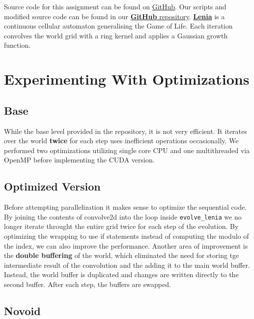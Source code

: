 \documentclass[11pt]{article}
\begin{document}
\maketitle

Source code for this assignment can be found on \href{https://github.com/laspp/HPC/blob/main/labs/03-Assignment2-CUDA/Assignment2.md}{GitHub}.
Our scripts and modified source code can be found in our \href{https://github.com/Edelwy/HPC}{\textbf{GitHub} repository}. \href{https://chakazul.github.io/lenia.html}{\textbf{Lenia}} is a continuous cellular automaton generalising the Game of Life. Each iteration convolves the world grid with a ring kernel and applies a Gaussian growth function.

\section{Experimenting With Optimizations}

\subsection{Base}

While the base level provided in the repository, it is not very efficient.
It iterates over the world \textbf{twice} for each step uses inefficient operations occasionally. We performed two optimizations utilizing single core CPU and one multithreaded via OpenMP before implementing the CUDA version.

\subsection{Optimized Version}

Before attempting parallelization it makes sense to optimize the sequential code.
By joining the contents of convolve2d into the loop inside \texttt{evolve\_lenia} we no longer iterate throught the entire grid twice for each step of the evolution. By optimizing the wrapping to use if statements instead of computing the modulo of the index, we can also improve the performance. Another area of improvement is the \textbf{double buffering} of the world, which eliminated the need for storing tge intermediate result of the convolution and the adding it to the main world buffer.
Instead, the world buffer is duplicated and changes are written directly to the second buffer. After each step, the buffers are swapped.

\subsection{Novoid}
\end{document}
